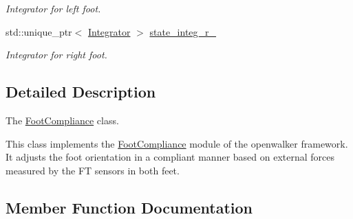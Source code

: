 \begin{DoxyCompactItemize}
\begin{DoxyCompactList}\small\item\em Integrator for left foot. \end{DoxyCompactList}\item 
std\+::unique\+\_\+ptr$<$ \hyperlink{classow__core_1_1StateIntegrator}{Integrator} $>$ \hyperlink{classow__fcm_1_1FootCompliance_a5dcb3233dcdd52ef1ec2abdc864a7168}{state\+\_\+integ\+\_\+r\+\_\+}\hypertarget{classow__fcm_1_1FootCompliance_a5dcb3233dcdd52ef1ec2abdc864a7168}{}\label{classow__fcm_1_1FootCompliance_a5dcb3233dcdd52ef1ec2abdc864a7168}

\begin{DoxyCompactList}\small\item\em Integrator for right foot. \end{DoxyCompactList}\end{DoxyCompactItemize}


\subsection{Detailed Description}
The \hyperlink{classow__fcm_1_1FootCompliance}{Foot\+Compliance} class. 

This class implements the \hyperlink{classow__fcm_1_1FootCompliance}{Foot\+Compliance} module of the openwalker framework. It adjusts the foot orientation in a compliant manner based on external forces measured by the FT sensors in both feet. 

\subsection{Member Function Documentation}

